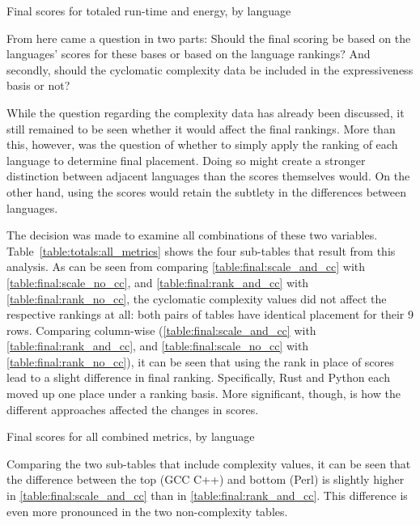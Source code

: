 \begin{table}[!htb]

\caption{Final scores for totaled run-time and energy, by language}
\label{table:totals:runtime-energy}
\end{table}

From here came a question in two parts: Should the final scoring be based on the languages' scores for these bases or based on the language rankings? And secondly, should the cyclomatic complexity data be included in the expressiveness basis or not?

While the question regarding the complexity data has already been discussed, it still remained to be seen whether it would affect the final rankings. More than this, however, was the question of whether to simply apply the ranking of each language to determine final placement. Doing so might create a stronger distinction between adjacent languages than the scores themselves would. On the other hand, using the scores would retain the subtlety in the differences between languages.

The decision was made to examine all combinations of these two variables. Table~\ref{table:totals:all_metrics} shows the four sub-tables that result from this analysis. As can be seen from comparing \ref{table:final:scale_and_cc} with \ref{table:final:scale_no_cc}, and \ref{table:final:rank_and_cc} with \ref{table:final:rank_no_cc}, the cyclomatic complexity values did not affect the respective rankings at all: both pairs of tables have identical placement for their 9 rows. Comparing column-wise (\ref{table:final:scale_and_cc} with \ref{table:final:rank_and_cc}, and \ref{table:final:scale_no_cc} with \ref{table:final:rank_no_cc}), it can be seen that using the rank in place of scores lead to a slight difference in final ranking. Specifically, Rust and Python each moved up one place under a ranking basis. More significant, though, is how the different approaches affected the changes in scores.

\begin{table}[!htb]

\caption{Final scores for all combined metrics, by language}
\label{table:totals:all_metrics}
\end{table}

Comparing the two sub-tables that include complexity values, it can be seen that the difference between the top (GCC C++) and bottom (Perl) is slightly higher in \ref{table:final:scale_and_cc} than in \ref{table:final:rank_and_cc}. This difference is even more pronounced in the two non-complexity tables.

